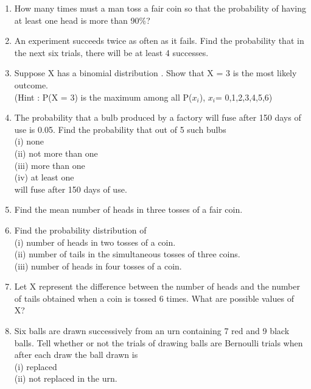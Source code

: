 
\renewcommand{\theequation}{\theenumi}
\begin{enumerate}[label=\thesection.\arabic*.,ref=\thesection.\theenumi]


\item How many times must a man toss a fair coin so that the probability of having at least one head is more than 90$\%$?\\
\item An experiment succeeds twice as often as it fails. Find the probability that in the next six trials, there will be at least 4 successes.\\
\item Suppose X has a binomial distribution . Show that X = 3 is the most likely outcome.\\
(Hint : P(X = 3) is the maximum among all P($x_i$), $x_i$= 0,1,2,3,4,5,6)\\
\item The probability that a bulb produced by a factory will fuse after 150 days of use
is 0.05. Find the probability that out of 5 such bulbs\\
(i) none\\
(ii) not more than one\\
(iii) more than one\\
(iv) at least one\\
will fuse after 150 days of use.\\
\item Find the mean number of heads in three tosses of a fair coin.\\

\item Find the probability distribution of\\
(i) number of heads in two tosses of a coin.\\
(ii) number of tails in the simultaneous tosses of three coins.\\
(iii) number of heads in four tosses of a coin.\\
\item Let X represent the difference between the number of heads and the number of tails obtained when a coin is tossed 6 times. What are possible values of X?\\
\item Six balls are drawn successively from an urn containing 7 red and 9 black balls. Tell whether or not the trials of drawing balls are Bernoulli trials when after each draw the ball drawn is\\
(i) replaced \\
(ii) not replaced in the urn.\\
\solution



\end{enumerate}
